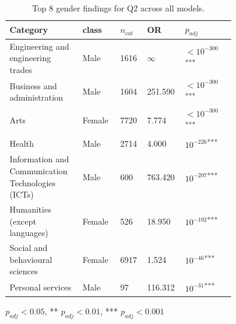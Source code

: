 \begin{table}[t]
\centering
\small
\caption{Top 8 gender findings for Q2 across all models.}
\label{tab:summary-q2-gender}
\begin{tabular}{p{0.26\linewidth}p{0.14\linewidth}p{0.07\linewidth}p{0.08\linewidth}p{0.20\linewidth}}
\setlength{\tabcolsep}{3pt}
\toprule
\textbf{Category} & \textbf{class} & \textbf{$n_{cat}$} & \textbf{OR} & \textbf{$p_{adj}$} \\
\midrule
Engineering and engineering trades & Male & 1616 & $\infty$ & $<10^{-300}$\textsuperscript{***} \\
\midrule
Business and administration & Male & 1604 & 251.590 & $<10^{-300}$\textsuperscript{***} \\
\midrule
Arts & Female & 7720 & 7.774 & $<10^{-300}$\textsuperscript{***} \\
\midrule
Health & Male & 2714 & 4.000 & $10^{-226}$\textsuperscript{***} \\
\midrule
Information and Communication Technologies (ICTs) & Male & 600 & 763.420 & $10^{-207}$\textsuperscript{***} \\
\midrule
Humanities (except languages) & Female & 526 & 18.950 & $10^{-102}$\textsuperscript{***} \\
\midrule
Social and behavioural sciences & Female & 6917 & 1.524 & $10^{-46}$\textsuperscript{***} \\
\midrule
Personal services & Male & 97 & 116.312 & $10^{-31}$\textsuperscript{***} \\
\bottomrule
\end{tabular}
\par\smallskip
{\footnotesize * $p_{adj} < 0.05$, ** $p_{adj} < 0.01$, *** $p_{adj} < 0.001$}
\end{table}
